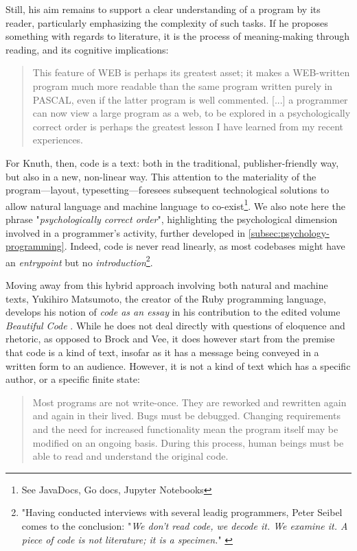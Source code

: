 Still, his aim remains to support a clear understanding of a program by its reader, particularly emphasizing the complexity of such tasks. If he proposes something with regards to literature, it is the process of meaning-making through reading, and its cognitive implications:

\begin{quote}
  This feature of WEB is perhaps its greatest asset; it makes a WEB-written program much more readable than the same program written purely in PASCAL, even if the latter program is well commented.  [...] a programmer can now view a large program as a web, to be explored in a psychologically correct order is perhaps the greatest lesson I have learned from my recent experiences. \citep{knuth_literate_1984}
\end{quote}

For Knuth, then, code is a text: both in the traditional, publisher-friendly way, but also in a new, non-linear way. This attention to the materiality of the program—layout, typesetting—foresees subsequent technological solutions to allow natural language and machine language to co-exist\footnote{See JavaDocs, Go docs, Jupyter Notebooks}. We also note here the phrase "\emph{psychologically correct order}", highlighting the psychological dimension involved in a programmer's activity, further developed in \autoref{subsec:psychology-programming}. Indeed, code is never read linearly, as most codebases might have an \emph{entrypoint} but no \emph{introduction}\footnote{"Having conducted interviews with several leadig programmers, Peter Seibel comes to the conclusion: "\emph{We don't read code, we decode it. We examine it. A piece of code is not literature; it is a specimen.}" \citep{seibel_code_2014}}.

Moving away from this hybrid approach involving both natural and machine texts, Yukihiro Matsumoto, the creator of the Ruby programming language, develops his notion of \emph{code as an essay} in his contribution to the edited volume \emph{Beautiful Code} \citep{oram_beautiful_2007}. While he does not deal directly with questions of eloquence and rhetoric, as opposed to Brock and Vee, it does however start from the premise that code is a kind of text, insofar as it has a message being conveyed in a written form to an audience. However, it is not a kind of text which has a specific author, or a specific finite state:

\begin{quote}
  Most programs are not write-once. They are reworked and rewritten again and again in their lived. Bugs must be debugged. Changing requirements and the need for increased functionality mean the program itself may be modified on an ongoing basis. During this process, human beings must be able to read and understand the original code. \citep{matsumoto_treating_2007}
\end{quote}

